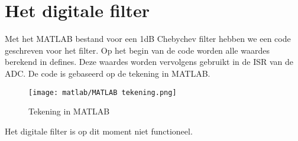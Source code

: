 \section{Het digitale filter}

Met het MATLAB bestand voor een 1dB Chebychev filter hebben we een code geschreven voor het filter. 
Op het begin van de code worden alle waardes berekend in defines.
Deze waardes worden vervolgens gebruikt in de ISR van de ADC. De code is gebaseerd op de tekening in MATLAB.

\begin{figure}[!h]
    \texttt{[image: matlab/MATLAB tekening.png]}
	\caption{Tekening in MATLAB}
	\label{fig:matlabDrawing}
\end{figure}

Het digitale filter is op dit moment niet functioneel. 
